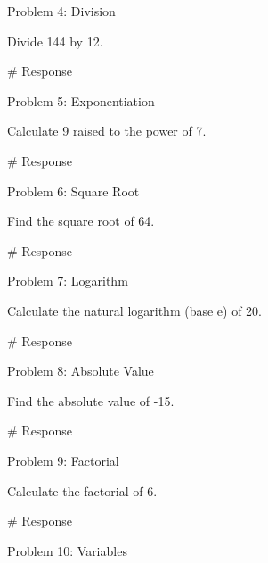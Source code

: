 \documentclass[
  letterpaper,
  DIV=11,
  numbers=noendperiod]{scrreprt}
\newenvironment{Shaded}{\begin{snugshade}}{\end{snugshade}}
\newcommand{\CommentTok}[1]{\textcolor[rgb]{0.37,0.37,0.37}{#1}}
\begin{document}
Problem 4: Division

Divide 144 by 12.

\begin{Shaded}
\begin{Highlighting}[]
\CommentTok{\# Response}
\end{Highlighting}
\end{Shaded}

Problem 5: Exponentiation

Calculate 9 raised to the power of 7.

\begin{Shaded}
\begin{Highlighting}[]
\CommentTok{\# Response}
\end{Highlighting}
\end{Shaded}

Problem 6: Square Root

Find the square root of 64.

\begin{Shaded}
\begin{Highlighting}[]
\CommentTok{\# Response}
\end{Highlighting}
\end{Shaded}

Problem 7: Logarithm

Calculate the natural logarithm (base e) of 20.

\begin{Shaded}
\begin{Highlighting}[]
\CommentTok{\# Response}
\end{Highlighting}
\end{Shaded}

Problem 8: Absolute Value

Find the absolute value of -15.

\begin{Shaded}
\begin{Highlighting}[]
\CommentTok{\# Response}
\end{Highlighting}
\end{Shaded}

Problem 9: Factorial

Calculate the factorial of 6.

\begin{Shaded}
\begin{Highlighting}[]
\CommentTok{\# Response}
\end{Highlighting}
\end{Shaded}

Problem 10: Variables
\end{document}
